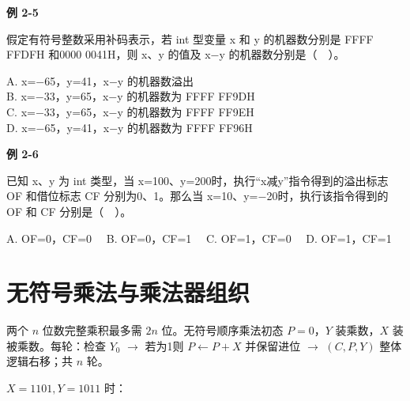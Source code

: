 \par\medskip{}\noindent\hypertarget{CO02-E05}{}\label{CO02-E05}\textbf{例 2-5}\par\nobreak\smallskip

假定有符号整数采用补码表示，若 int 型变量 x 和 y 的机器数分别是 FFFF FFDFH 和0000 0041H，则 x、y 的值及 x\ensuremath{-}y 的机器数分别是（　）。

A. x=\ensuremath{-}65，y=41，x\ensuremath{-}y 的机器数溢出\\
B. x=\ensuremath{-}33，y=65，x\ensuremath{-}y 的机器数为 FFFF FF9DH\\
C. x=\ensuremath{-}33，y=65，x\ensuremath{-}y 的机器数为 FFFF FF9EH\\
D. x=\ensuremath{-}65，y=41，x\ensuremath{-}y 的机器数为 FFFF FF96H

\par\medskip{}\noindent\hypertarget{CO02-E06}{}\label{CO02-E06}\textbf{例 2-6}\par\nobreak\smallskip

已知 x、y 为 int 类型，当 x=100、y=200时，执行``x减y''指令得到的溢出标志 OF 和借位标志 CF 分别为0、1。那么当 x=10、y=\ensuremath{-}20时，执行该指令得到的 OF 和 CF 分别是（　）。

A. OF=0，CF=0　 B. OF=0，CF=1　 C. OF=1，CF=0　 D. OF=1，CF=1

\section{无符号乘法与乘法器组织}\label{CO02-multiply}

两个 \(n\) 位数完整乘积最多需 \(2n\) 位。无符号顺序乘法初态 \(P=0\)，\(Y\) 装乘数，\(X\) 装被乘数。每轮：检查 \(Y_0\) \ensuremath{\to} 若为1则 \(P\leftarrow P+X\) 并保留进位 \ensuremath{\to} \((C,P,Y)\) 整体逻辑右移；共 \(n\) 轮。

\(X=1101,Y=1011\) 时：

